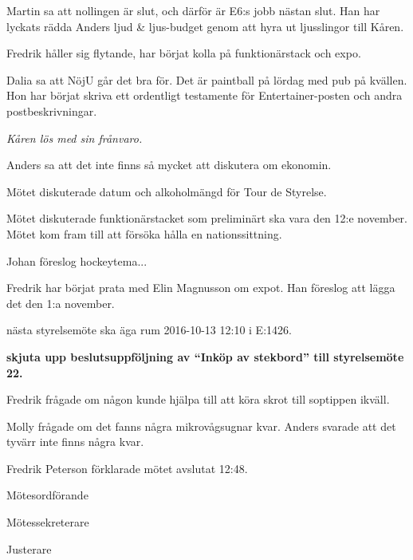 \documentclass[10pt]{article}
\def\mo{Fredrik Peterson}
\def\ms{Erik Månsson}
\def\ji{Molly Rusk}
\begin{document}
\begin{paragrafer}
\begin{paragrafer}
Martin sa att nollingen är slut, och därför är E6:s jobb nästan slut. Han har lyckats rädda Anders ljud \& ljus-budget genom att hyra ut ljusslingor till Kåren.

Fredrik håller sig flytande, har börjat kolla på funktionärstack och expo.

Dalia sa att NöjU går det bra för. Det är paintball på lördag med pub på kvällen. Hon har börjat skriva ett ordentligt testamente för Entertainer-posten och andra postbeskrivningar.

\emph{Kåren lös med sin frånvaro.}

Anders sa att det inte finns så mycket att diskutera om ekonomin.

\end{paragrafer}

Mötet diskuterade datum och alkoholmängd för Tour de Styrelse.

Mötet diskuterade funktionärstacket som preliminärt ska vara den 12:e november. Mötet kom fram till att försöka hålla en nationssittning.

Johan föreslog hockeytema...

Fredrik har börjat prata med Elin Magnusson om expot. Han föreslog att lägga det den 1:a november.

\Mba nästa styrelsemöte ska äga rum 2016-10-13 12:10 i E:1426.

\textbf{\Mba skjuta upp beslutsuppföljning av ``Inköp av stekbord'' till styrelsemöte 22.}

\Ibfu

Fredrik frågade om någon kunde hjälpa till att köra skrot till soptippen ikväll.

Molly frågade om det fanns några mikrovågsugnar kvar. Anders svarade att det tyvärr inte finns några kvar.

{\mo} förklarade mötet avslutat 12:48.

\end{paragrafer}

\hidesignfoot
\begin{signatures}{3}
\signature{\mo}{Mötesordförande}
\signature{\ms}{Mötessekreterare}
\signature{\ji}{Justerare}
\end{signatures}
\end{document}
